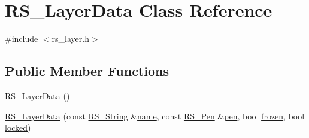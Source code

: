 \hypertarget{class_r_s___layer_data}{\section{R\-S\-\_\-\-Layer\-Data Class Reference}
\label{class_r_s___layer_data}
}


{\ttfamily \#include $<$rs\-\_\-layer.\-h$>$}

\subsection*{Public Member Functions}
\begin{DoxyCompactItemize}
\item 
\hyperlink{class_r_s___layer_data_ac12ac5d2a831dab22d4eacbb868443d9}{R\-S\-\_\-\-Layer\-Data} ()
\item 
\hyperlink{class_r_s___layer_data_a73d509d4fdf1b20ae4a4acaae8a557f4}{R\-S\-\_\-\-Layer\-Data} (const \hyperlink{rs__string_8h_a5adec11f318c2ae2ecdc6fe2b03be9fa}{R\-S\-\_\-\-String} \&\hyperlink{class_r_s___layer_data_a1498ff898dacc250220f3335a1846f94}{name}, const \hyperlink{class_r_s___pen}{R\-S\-\_\-\-Pen} \&\hyperlink{class_r_s___layer_data_af48b45bd16d5049c5cf119937e3431dc}{pen}, bool \hyperlink{class_r_s___layer_data_ad8354948505fd761a0adc5139583e5f5}{frozen}, bool \hyperlink{class_r_s___layer_data_a494d27995246b1865aabda3ce5e90974}{locked})
\end{DoxyCompactItemize}
